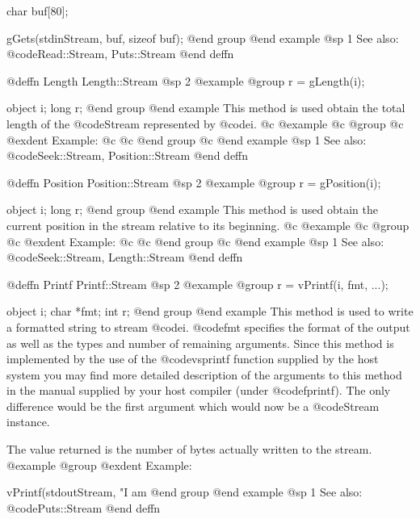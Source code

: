 char    buf[80];

gGets(stdinStream, buf, sizeof buf);
@end group
@end example
@sp 1
See also:  @code{Read::Stream, Puts::Stream}
@end deffn







@deffn {Length} Length::Stream
@sp 2
@example
@group
r = gLength(i);

object  i;
long    r;
@end group
@end example
This method is used obtain the total length of the @code{Stream} represented
by @code{i}.
@c @example
@c @group
@c @exdent Example:
@c  
@c @end group
@c @end example
@sp 1
See also:  @code{Seek::Stream, Position::Stream}
@end deffn









@deffn {Position} Position::Stream
@sp 2
@example
@group
r = gPosition(i);

object  i;
long    r;
@end group
@end example
This method is used obtain the current position in the stream
relative to its beginning.
@c @example
@c @group
@c @exdent Example:
@c  
@c @end group
@c @end example
@sp 1
See also:  @code{Seek::Stream, Length::Stream}
@end deffn








@deffn {Printf} Printf::Stream
@sp 2
@example
@group
r = vPrintf(i, fmt, ...);

object  i;
char    *fmt;
int     r;
@end group
@end example
This method is used to write a formatted string to stream @code{i}.
@code{fmt} specifies the format of the output as well as the types and
number of remaining arguments.  Since this method is implemented by the
use of the @code{vsprintf} function supplied by the host system you may
find more detailed description of the arguments to this method in the
manual supplied by your host compiler (under @code{fprintf}).  The only
difference would be the first argument which would now be a @code{Stream}
instance.

The value returned is the number of bytes actually written to the stream.
@example
@group
@exdent Example:
 
vPrintf(stdoutStream, "I am %
@end group
@end example
@sp 1
See also:  @code{Puts::Stream}
@end deffn







